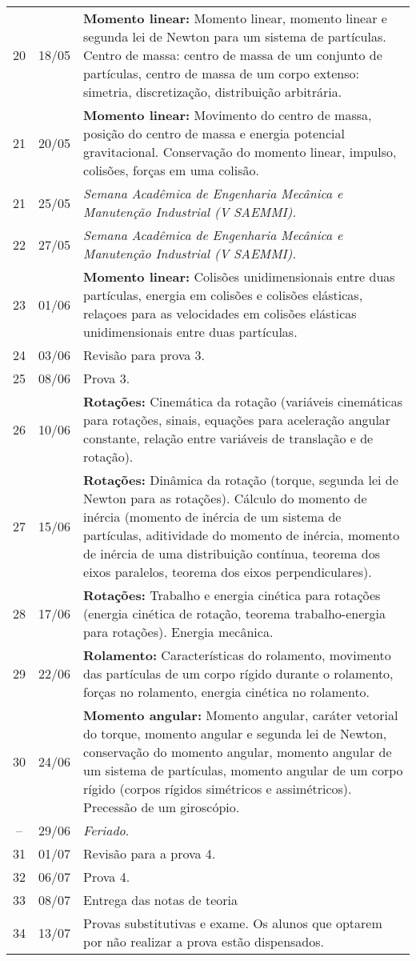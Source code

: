 \begin{center}
\begin{longtable}{ccp{70mm}}
 20 & 18/05 & \textbf{Momento linear:} Momento linear, momento linear e segunda lei de Newton para um sistema de partículas. Centro de massa: centro de massa de um conjunto de partículas, centro de massa de um corpo extenso: simetria, discretização, distribuição arbitrária. \\
 21 & 20/05 & \textbf{Momento linear:} Movimento do centro de massa, posição do centro de massa e energia potencial gravitacional. Conservação do momento linear, impulso, colisões, forças em uma colisão. \\
 21 & 25/05 & \emph{Semana Acadêmica de Engenharia Mecânica e Manutenção Industrial (V SAEMMI).} \\
 22 & 27/05 & \emph{Semana Acadêmica de Engenharia Mecânica e Manutenção Industrial (V SAEMMI).} \\ 
 23 & 01/06 & \textbf{Momento linear:} Colisões unidimensionais entre duas partículas, energia em colisões e colisões elásticas, relaçoes para as velocidades em colisões elásticas unidimensionais entre duas partículas. \\
 24 & 03/06 & Revisão para prova 3. \\
 25 & 08/06 & Prova 3. \\
 26 & 10/06 & \textbf{Rotações:} Cinemática da rotação (variáveis cinemáticas para rotações, sinais, equações para aceleração angular constante, relação entre variáveis de translação e de rotação). \\
 27 & 15/06 & \textbf{Rotações:} Dinâmica da rotação (torque, segunda lei de Newton para as rotações). Cálculo do momento de inércia (momento de inércia de um sistema de partículas, aditividade do momento de inércia, momento de inércia de uma distribuição contínua, teorema dos eixos paralelos, teorema dos eixos perpendiculares). \\
 28 & 17/06 & \textbf{Rotações:} Trabalho e energia cinética para rotações (energia cinética de rotação, teorema trabalho-energia para rotações). Energia mecânica. \\
 29 & 22/06 & \textbf{Rolamento:} Características do rolamento, movimento das partículas de um corpo rígido durante o rolamento, forças no rolamento, energia cinética no rolamento. \\
 30 & 24/06 & \textbf{Momento angular:} Momento angular, caráter vetorial do torque, momento angular e segunda lei de Newton, conservação do momento angular, momento angular de um sistema de partículas, momento angular de um corpo rígido (corpos rígidos simétricos e assimétricos). Precessão de um giroscópio. \\
 -- & 29/06 & \emph{Feriado}. \\
 31 & 01/07 & Revisão para a prova 4. \\
 32 & 06/07 & Prova 4. \\
 33 & 08/07 & Entrega das notas de teoria \\
 34 & 13/07 & Provas substitutivas e exame. Os alunos que optarem por não realizar a prova estão dispensados.
\end{longtable}
\end{center}

